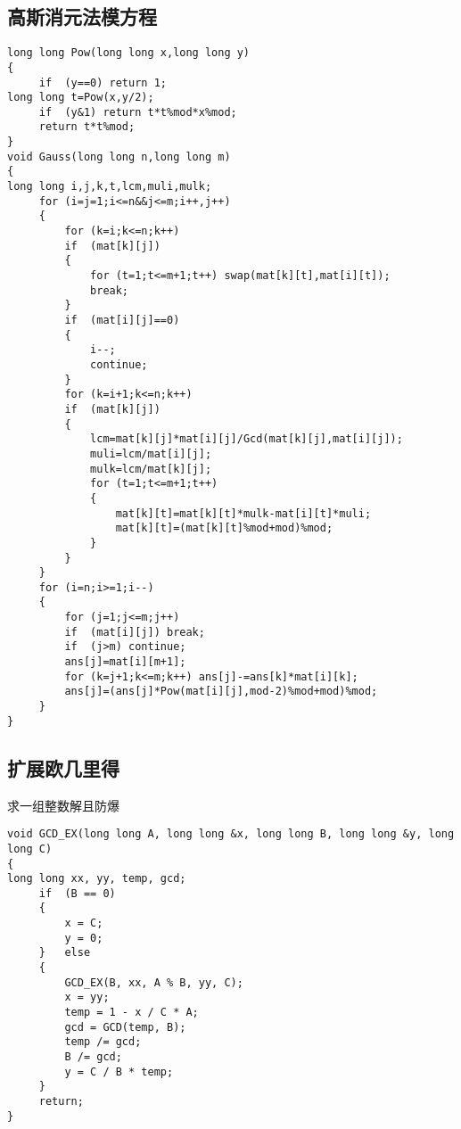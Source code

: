 \documentclass{article}
\begin{document}
\begin{CJK*}{UTF8}{song}
\subsection{高斯消元法模方程}
\begin{lstlisting}
long long Pow(long long x,long long y)
{
     if  (y==0) return 1;
long long t=Pow(x,y/2);
     if  (y&1) return t*t%mod*x%mod;
     return t*t%mod;
}
void Gauss(long long n,long long m)
{
long long i,j,k,t,lcm,muli,mulk;
     for (i=j=1;i<=n&&j<=m;i++,j++)
     {
         for (k=i;k<=n;k++)
         if  (mat[k][j])
         {
             for (t=1;t<=m+1;t++) swap(mat[k][t],mat[i][t]);
             break;
         }
         if  (mat[i][j]==0)
         {
             i--;
             continue;
         }
         for (k=i+1;k<=n;k++)
         if  (mat[k][j])
         {
             lcm=mat[k][j]*mat[i][j]/Gcd(mat[k][j],mat[i][j]);
             muli=lcm/mat[i][j];
             mulk=lcm/mat[k][j];
             for (t=1;t<=m+1;t++)
             {
                 mat[k][t]=mat[k][t]*mulk-mat[i][t]*muli;
                 mat[k][t]=(mat[k][t]%mod+mod)%mod;
             }
         }
     }
     for (i=n;i>=1;i--)
     {
         for (j=1;j<=m;j++)
         if  (mat[i][j]) break;
         if  (j>m) continue;
         ans[j]=mat[i][m+1];
         for (k=j+1;k<=m;k++) ans[j]-=ans[k]*mat[i][k];
         ans[j]=(ans[j]*Pow(mat[i][j],mod-2)%mod+mod)%mod;
     }
}
\end{lstlisting}
\subsection{扩展欧几里得}
求一组整数解且防爆
\begin{lstlisting}
void GCD_EX(long long A, long long &x, long long B, long long &y, long long C)
{
long long xx, yy, temp, gcd;
     if  (B == 0)
     {
         x = C;
         y = 0;
     }   else
     {
         GCD_EX(B, xx, A % B, yy, C);
         x = yy;
         temp = 1 - x / C * A;
         gcd = GCD(temp, B);
         temp /= gcd;
         B /= gcd;
         y = C / B * temp;
     }
     return;
}
\end{lstlisting}

\end{CJK*}
\end{document}
